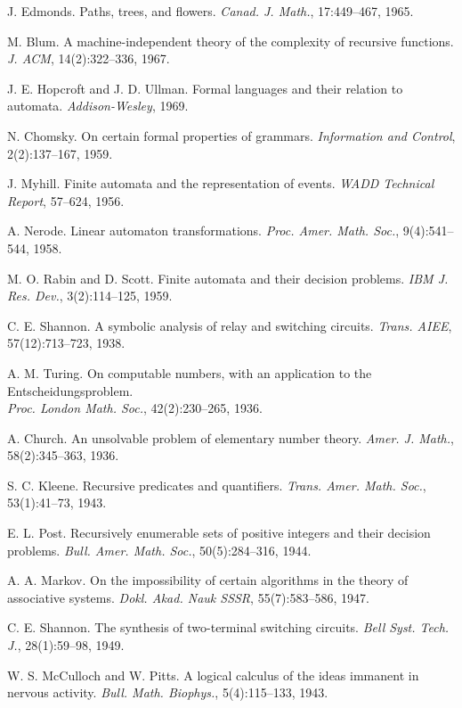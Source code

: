 \documentclass[11pt]{article}
\theoremstyle{definition}
\begin{document}
\begin{thebibliography}{99}
 J. Edmonds. Paths, trees, and flowers. \emph{Canad. J. Math.}, 17:449--467, 1965.

 M. Blum. A machine-independent theory of the complexity of recursive functions. \emph{J. ACM}, 14(2):322--336, 1967.

 J. E. Hopcroft and J. D. Ullman. Formal languages and their relation to automata. \emph{Addison-Wesley}, 1969.

 N. Chomsky. On certain formal properties of grammars. \emph{Information and Control}, 2(2):137--167, 1959.

 J. Myhill. Finite automata and the representation of events. \emph{WADD Technical Report}, 57--624, 1956.

 A. Nerode. Linear automaton transformations. \emph{Proc. Amer. Math. Soc.}, 9(4):541--544, 1958.

 M. O. Rabin and D. Scott. Finite automata and their decision problems. \emph{IBM J. Res. Dev.}, 3(2):114--125, 1959.

 C. E. Shannon. A symbolic analysis of relay and switching circuits. \emph{Trans. AIEE}, 57(12):713--723, 1938.

 A. M. Turing. On computable numbers, with an application to the Entscheidungsproblem. \\
\emph{Proc. London Math. Soc.}, 42(2):230--265, 1936.

 A. Church. An unsolvable problem of elementary number theory. \emph{Amer. J. Math.}, 58(2):345--363, 1936.

 S. C. Kleene. Recursive predicates and quantifiers. \emph{Trans. Amer. Math. Soc.}, 53(1):41--73, 1943.

 E. L. Post. Recursively enumerable sets of positive integers and their decision problems. \emph{Bull. Amer. Math. Soc.}, 50(5):284--316, 1944.

 A. A. Markov. On the impossibility of certain algorithms in the theory of associative systems. \emph{Dokl. Akad. Nauk SSSR}, 55(7):583--586, 1947.

 C. E. Shannon. The synthesis of two-terminal switching circuits. \emph{Bell Syst. Tech. J.}, 28(1):59--98, 1949.

 W. S. McCulloch and W. Pitts. A logical calculus of the ideas immanent in nervous activity. \emph{Bull. Math. Biophys.}, 5(4):115--133, 1943.


\end{thebibliography}
\end{document}
